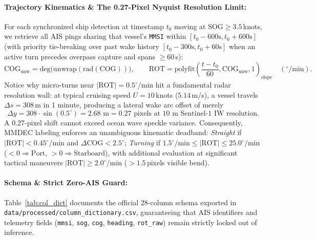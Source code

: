 \documentclass[11pt,a4paper]{article}
\begin{document}
\paragraph{Trajectory Kinematics \& The 0.27-Pixel Nyquist Resolution Limit:}
For each synchronized ship detection at timestamp $t_0$ moving at $\text{SOG}\ge 3.5$\,knots, we retrieve all AIS pings sharing that vessel's \texttt{MMSI} within $[t_0-600\text{s}, t_0+600\text{s}]$ (with priority tie-breaking over past wake history $[t_0-300\text{s}, t_0+60\text{s}]$ when an active turn precedes overpass capture and spans $\ge 60$\,s):
\begin{equation}
\text{COG}_{\text{unw}} = \text{deg}\big(\text{unwrap}(\text{rad}(\text{COG}))\big), \qquad \text{ROT} = \text{polyfit}\left(\frac{t - t_0}{60}, \text{COG}_{\text{unw}}, 1\right)_{\text{slope}} \quad (^\circ/\text{min}).
\end{equation}
Notice why micro-turns near $|\text{ROT}| = 0.5^\circ$/min hit a fundamental radar resolution wall: at typical cruising speed $U=10$\,knots ($5.14$\,m/s), a vessel travels $\Delta s = 308$\,m in 1 minute, producing a lateral wake arc offset of merely
\begin{equation}
\Delta y = 308 \cdot \sin(0.5^\circ) = 2.68\text{ m} = 0.27\text{ pixels at } 10\text{ m Sentinel-1 IW resolution.}
\end{equation}
A $0.27$-pixel shift cannot exceed ocean wave speckle variance. Consequently, MMDEC labeling enforces an unambiguous kinematic deadband: \textit{Straight} if $|\text{ROT}|<0.45^\circ$/min and $\Delta\text{COG}<2.5^\circ$; \textit{Turning} if $1.5^\circ/\text{min}\le|\text{ROT}|\le 25.0^\circ/\text{min}$ ($<0\Rightarrow\text{Port}$, $>0\Rightarrow\text{Starboard}$), with additional evaluation at significant tactical maneuvers $|\text{ROT}|\ge 2.0^\circ$/min ($>1.5$\,pixels visible bend).

\paragraph{Schema \& Strict Zero-AIS Guard:}
Table~\ref{tab:col_dict} documents the official 28-column schema exported in \texttt{data/processed/column\_dictionary.csv}, guaranteeing that AIS identifiers and telemetry fields (\texttt{mmsi}, \texttt{sog}, \texttt{cog}, \texttt{heading}, \texttt{rot\_raw}) remain strictly locked out of inference.
\end{document}
